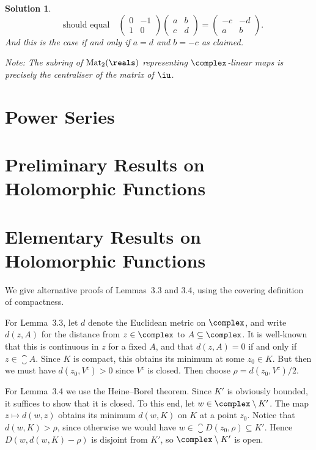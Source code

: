 \documentclass[article, a4paper, 11pt, oneside]{memoir}
\numberwithin{equation}{chapter}
\theoremstyle{nonumberplain}
\newtheorem{solution}{Solution}
\begin{document}
\begin{solution}
\begin{equation*}
        \quad \text{should equal} \quad
        \begin{pmatrix}
            0 & -1 \\
            1 & 0
        \end{pmatrix}
        \begin{pmatrix}
            a & b \\
            c & d
        \end{pmatrix}
        =
        \begin{pmatrix}
            -c & -d \\
            a & b
        \end{pmatrix}.
    \end{equation*}
    And this is the case if and only if $a = d$ and $b = -c$ as claimed.

    Note: The subring of $\mathrm{Mat}_2(\reals)$ representing $\complex$-linear maps is precisely the centraliser of the matrix of $\iu$.
\end{solution}


\chapter{Power Series}

\chapter{Preliminary Results on Holomorphic Functions}

\chapter{Elementary Results on Holomorphic Functions}

\begin{remarkbreak}
    We give alternative proofs of Lemmas~3.3 and 3.4, using the covering definition of compactness.

    For Lemma~3.3, let $d$ denote the Euclidean metric on $\complex$, and write $d(z,A)$ for the distance from $z \in \complex$ to $A \subseteq \complex$. It is well-known that this is continuous in $z$ for a fixed $A$, and that $d(z,A) = 0$ if and only if $z \in \closure{A}$. Since $K$ is compact, this obtains its minimum at some $z_0 \in K$. But then we must have $d(z_0,V^c) > 0$ since $V^c$ is closed. Then choose $\rho = d(z_0,V^c)/2$.

    For Lemma~3.4 we use the Heine--Borel theorem. Since $K'$ is obviously bounded, it suffices to show that it is closed. To this end, let $w \in \complex \setminus K'$. The map $z \mapsto d(w,z)$ obtains its minimum $d(w,K)$ on $K$ at a point $z_0$. Notice that $d(w,K) > \rho$, since otherwise we would have $w \in \closure{D}(z_0,\rho) \subseteq K'$. Hence $D(w,d(w,K)-\rho)$ is disjoint from $K'$, so $\complex \setminus K'$ is open.
\end{remarkbreak}
\end{document}
